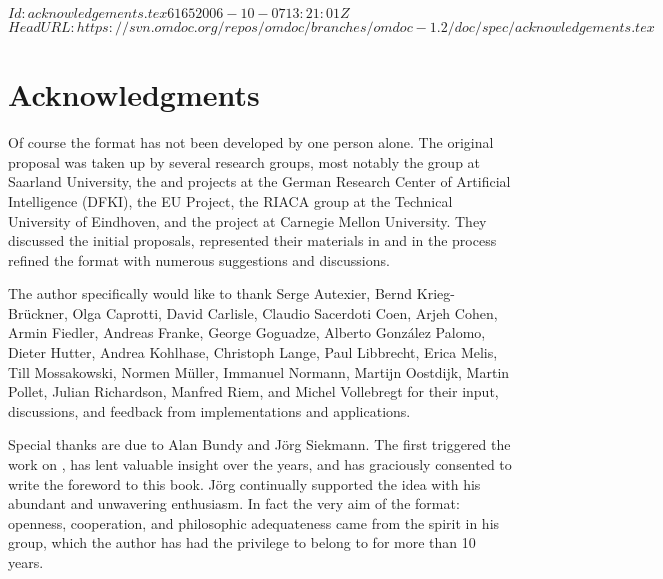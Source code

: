 \svnInfo $Id: acknowledgements.tex 6165 2006-10-07 13:21:01Z  $
\svnKeyword $HeadURL: https://svn.omdoc.org/repos/omdoc/branches/omdoc-1.2/doc/spec/acknowledgements.tex $

\chapter*{Acknowledgments}
 \thispagestyle{empty}
Of course the {\omdoc} format has not been developed by one person
alone. The original proposal was taken up by several research
groups, most notably the {\OMEGA} group at Saarland University, the
{\maya} and {\activemath} projects at the German Research Center of
Artificial Intelligence (DFKI), the {} EU Project, the
RIACA group at the Technical University of Eindhoven, and the
{} project at Carnegie Mellon University.  They
discussed the initial proposals, represented their materials in
{\omdoc} and in the process refined the format with numerous
suggestions and discussions.

The author specifically would like to thank Serge Autexier, Bernd Krieg-Br\"uckner, Olga
Caprotti, David Carlisle, Claudio Sacerdoti Coen, Arjeh Cohen, Armin Fiedler, Andreas
Franke, George Goguadze, Alberto Gonz\'alez Palomo, Dieter Hutter, Andrea Kohlhase,
Christoph Lange, Paul Libbrecht, Erica Melis, Till Mossakowski, Normen M\"uller, Immanuel
Normann, Martijn Oostdijk, Martin Pollet, Julian Richardson, Manfred Riem, and Michel
Vollebregt for their input, discussions, and feedback from implementations and
applications.

Special thanks are due to Alan Bundy and J\"org Siekmann. The first
triggered the work on {\omdoc}, has lent valuable insight over the
years, and has graciously consented to write the foreword to this
book. J\"org continually supported the {\omdoc} idea with his
abundant and unwavering enthusiasm. In fact the very aim of the
{\omdoc} format: openness, cooperation, and philosophic adequateness
came from the spirit in his {\OMEGA} group, which the author has had
the privilege to belong to for more than 10 years.

